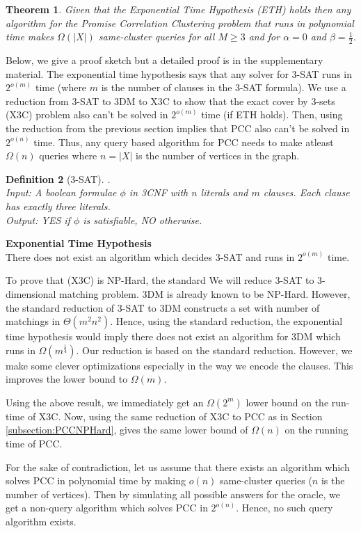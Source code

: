 \documentclass[12pt]{article}
\newtheorem{theorem}{Theorem}
\newtheorem{definition}[theorem]{Definition}
\begin{document}
\begin{theorem}
Given that the Exponential Time Hypothesis (ETH) holds then any algorithm for the Promise Correlation Clustering problem  that runs in polynomial time makes $\Omega(|X|)$ same-cluster queries for all $M \ge 3$ and for $\alpha = 0$ and $\beta = \frac{1}{2}$. 
\end{theorem}

\noindent Below, we give a proof sketch but a detailed proof is in the supplementary material. The exponential time hypothesis says that any solver for $3$-SAT runs in $2^{o(m)}$ time (where $m$ is the number of clauses in the $3$-SAT formula). We use a reduction from $3$-SAT to 3DM to X3C to show that the exact cover by 3-sets (X3C) problem also can't be solved in $2^{o(m)}$ time (if ETH holds). Then, using the reduction from the previous section implies that PCC also can't be solved in $2^{o(n)}$ time. Thus, any query based algorithm for PCC needs to make atleast $\Omega(n)$ queries where $n = |X|$ is the number of vertices in the graph. 

\begin{definition}[3-SAT].\\
Input: A boolean formulae $\phi$ in 3CNF with $n$ literals and $m$ clauses. Each clause has exactly three literals. \\
Output: YES if $\phi$ is satisfiable, NO otherwise. 
\end{definition}

\noindent\textbf{Exponential Time Hypothesis}\\
There does not exist an algorithm which decides 3-SAT  and runs in $2^{o(m)}$ time.

\noindent To prove that (X3C) is NP-Hard, the standard We will reduce 3-SAT to 3-dimensional matching problem. 3DM is already known to be NP-Hard. However, the standard reduction of 3-SAT to 3DM constructs a set with number of matchings in $\Theta(m^2 n^2)$. Hence, using the standard reduction, the exponential time hypothesis would imply there does not exist an algorithm for 3DM which runs in $\Omega(m^\frac{1}{4})$. Our reduction is based on the standard reduction. However, we make some clever optimizations especially in the way we encode the clauses. This improves the lower bound to $\Omega(m)$.

Using the above result, we immediately get an $\Omega(2^m)$ lower bound on the run-time of X3C. Now, using the same reduction of X3C to PCC as in Section \ref{subsection:PCCNPHard}, gives the same lower bound of $\Omega(n)$ on the running time of PCC. 

For the sake of contradiction, let us assume that there exists an algorithm which solves PCC in polynomial time by making $o(n)$ same-cluster queries ($n$ is the number of vertices). Then by simulating all possible answers for the oracle, we get a non-query algorithm which solves PCC in $2^{o(n)}$. Hence, no such query algorithm exists. 

\ifdefined\COMPLETE
\else
\end{document}

